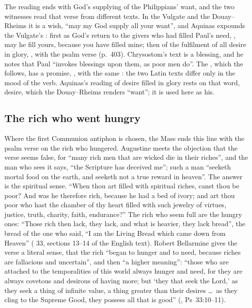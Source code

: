 The reading ends with God's supplying of the Philippians' want, and the two
witnesses read that verse from different texts. In the Vulgate and the
Douay--Rheims it is a wish, ``may my God supply all your want'', and Aquinas
expounds the Vulgate's : first as God's return
to the givers who had filled Paul's need, , may he fill yours, because you have filled mine; then of the fulfilment
of all desire in glory, , with the
psalm verse  (p.~403). Chrysostom's
text is a blessing, and he notes that Paul ``invokes blessings upon them, as poor
men do''. The , which the  follows, has a
promise, , with the same :
the two Latin texts differ only in the mood of the verb. Aquinas's reading of
desire filled in glory rests on that word, desire, which the Douay--Rheims
renders ``want''; it is used here as his.

\subsection{The rich who went hungry}

Where the first Communion antiphon is chosen, the Mass ends this line with the
psalm verse on the rich who hungered. Augustine meets the objection that the
verse seems false, for ``many rich men that are wicked die in their riches'',
and the man who sees it says, ``the Scripture has deceived me''; such a man
``seeketh mortal food on the earth, and seeketh not a true reward in heaven''.
The answer is the spiritual sense. ``When thou art filled with spiritual riches,
canst thou be poor? And was he therefore rich, because he had a bed of ivory;
and art thou poor who hast the chamber of thy heart filled with such jewelry of
virtues, justice, truth, charity, faith, endurance?'' The rich who seem full
are the hungry ones: ``Those rich then lack, they lack, and what is heavier,
they lack bread'', the bread of the one who said, ``I am the Living Bread which
came down from Heaven'' ( 33, sections 13--14 of
the English text). Robert Bellarmine gives the verse a literal sense, that the
rich ``began to hunger and to need, because riches are fallacious and
uncertain'', and then ``a higher meaning'': ``those who are attached to the
temporalities of this world always hunger and need, for they are always
covetous and desirous of having more; but `they that seek the Lord,' as they
seek a thing of infinite value, a thing greater than their desires \ldots\ as
they cling to the Supreme Good, they possess all that is good''
(, Ps~33:10--11).


